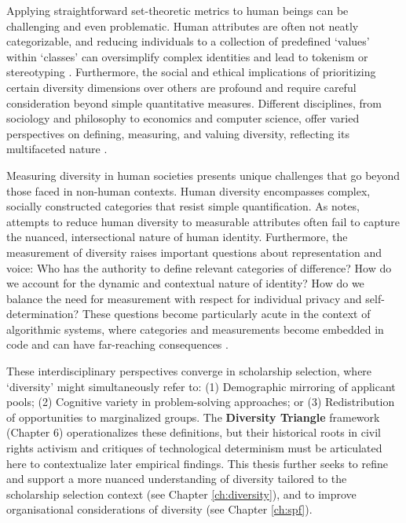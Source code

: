 Applying straightforward set-theoretic metrics to human beings can be challenging and even problematic. Human attributes are often not neatly categorizable, and reducing individuals to a collection of predefined `values' within `classes' can oversimplify complex identities and lead to tokenism or stereotyping \cite{Steel_Multiple_2018}. Furthermore, the social and ethical implications of prioritizing certain diversity dimensions over others are profound and require careful consideration beyond simple quantitative measures. Different disciplines, from sociology and philosophy to economics and computer science, offer varied perspectives on defining, measuring, and valuing diversity, reflecting its multifaceted nature \cite{Stirling_General_2007,Mitchell_Diversity_2020,Steel_Multiple_2018}.

Measuring diversity in human societies presents unique challenges that go beyond those faced in non-human contexts. Human diversity encompasses complex, socially constructed categories that resist simple quantification. As \textcite{scheuerman2019computers} notes, attempts to reduce human diversity to measurable attributes often fail to capture the nuanced, intersectional nature of human identity. Furthermore, the measurement of diversity raises important questions about representation and voice: Who has the authority to define relevant categories of difference? How do we account for the dynamic and contextual nature of identity? How do we balance the need for measurement with respect for individual privacy and self-determination? These questions become particularly acute in the context of algorithmic systems, where categories and measurements become embedded in code and can have far-reaching consequences \cite{bowker1999sorting}.

These interdisciplinary perspectives converge in scholarship selection, where `diversity' might simultaneously refer to: (1) Demographic mirroring of applicant pools; (2) Cognitive variety in problem-solving approaches; or (3) Redistribution of opportunities to marginalized groups. The \textbf{Diversity Triangle} framework (Chapter 6) operationalizes these definitions, but their historical roots in civil rights activism and critiques of technological determinism \cite{winner1980artefacts} must be articulated here to contextualize later empirical findings. This thesis further seeks to refine and support a more nuanced understanding of diversity tailored to the scholarship selection context (see Chapter \ref{ch:diversity}), and to improve organisational considerations of diversity (see Chapter \ref{ch:spf}).

